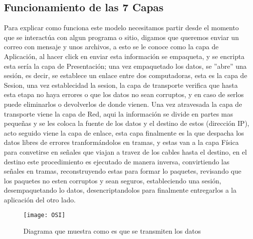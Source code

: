 \subsection{Funcionamiento de las 7 Capas}
Para explicar como funciona este modelo necesitamos partir desde el momento que se interactúa con algun programa o sitio, digamos que queremos enviar un correo con mensaje y unos archivos, a esto se le conoce como la capa de Aplicación, al hacer click en enviar esta información se empaqueta, y se encripta esta sería la capa de Presentación; una vez empaquetado los datos, se ''abre'' una sesión, es decir, se establece un enlace entre dos computadoras, esta es la capa de Sesion, una vez establecidad la sesion, la capa de transporte verifica que hasta esta etapa no haya errores o que los datos no sean corruptos, y en caso de serlos puede eliminarlos o devolverlos de donde vienen. Una vez atravesada la capa de transporte viene la capa de Red, aqui la información se divide en partes mas pequeñas y se les coloca la fuente de los datos y el destino de estos (dirección IP), acto seguido viene la capa de enlace, esta capa finalmente es la que despacha los datos libres de errores tranformándolos en tramas, y estas van a la capa Física para convetirse en señales que viajan a travez de los cables hasta el destino, en el destino este procedimiento es ejecutado de manera inversa, convirtiendo las señales en tramas, reconstruyendo estas para formar lo paquetes, revisando que los paquetes no esten corruptos y sean seguros, estableciendo una sesión, desempaquetando lo datos, desencriptandolos para finalmente entregarlos a la aplicación del otro lado.
\vspace{-2cm}
\begin{figure}[!ht]
\centering
\texttt{[image: OSI]}
\caption{Diagrama que muestra como es que se transmiten los datos}
\end{figure}



